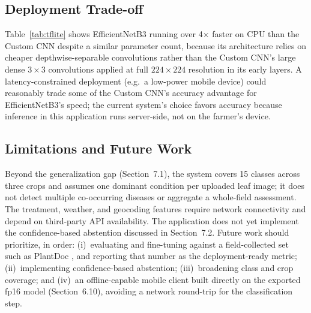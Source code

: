\documentclass[12pt,a4paper]{article}
\begin{document}
\subsection{Deployment Trade-off}
Table~\ref{tab:tflite} shows EfficientNetB3 running over 4$\times$ faster on
CPU than the Custom CNN despite a similar parameter count, because its
architecture relies on cheaper depthwise-separable convolutions
\cite{tan2019efficientnet} rather than the Custom CNN's large dense
$3\times3$ convolutions applied at full $224\times224$ resolution in its
early layers. A latency-constrained deployment (e.g.\ a low-power mobile
device) could reasonably trade some of the Custom CNN's accuracy advantage
for EfficientNetB3's speed; the current system's choice favors accuracy
because inference in this application runs server-side, not on the farmer's
device.

\subsection{Limitations and Future Work}
Beyond the generalization gap (Section~7.1), the system covers 15 classes
across three crops and assumes one dominant condition per uploaded leaf
image; it does not detect multiple co-occurring diseases or aggregate a
whole-field assessment. The treatment, weather, and geocoding features
require network connectivity and depend on third-party API availability. The
application does not yet implement the confidence-based abstention discussed
in Section~7.2. Future work should prioritize, in order: (i)~evaluating and
fine-tuning against a field-collected set such as PlantDoc
\cite{singh2020plantdoc}, and reporting that number as the deployment-ready
metric; (ii)~implementing confidence-based abstention; (iii)~broadening class
and crop coverage; and (iv)~an offline-capable mobile client built directly
on the exported fp16 model (Section~6.10), avoiding a network round-trip for
the classification step.

\end{document}
